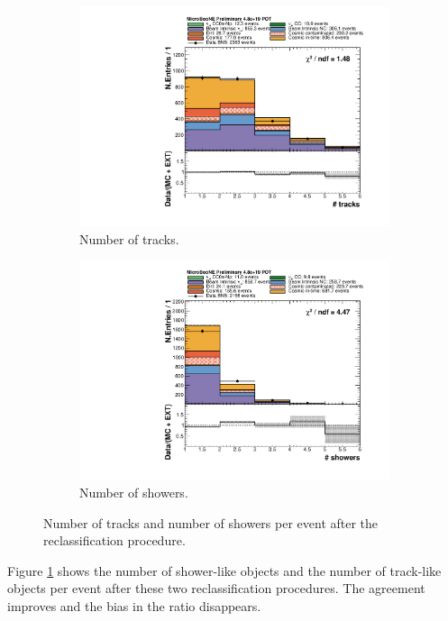 \begin{figure}[htbp]
\centering
  \begin{subfigure}{0.45\textwidth}
    \includegraphics[width=\linewidth]{figures/h_n_tracks.pdf}
    \caption{Number of tracks.} 
  \end{subfigure}
    \begin{subfigure}{0.45\textwidth}
    \includegraphics[width=\linewidth]{figures/h_n_showers.pdf}
    \caption{Number of showers.} 
  \end{subfigure}
  \caption{Number of tracks and number of showers per event after the reclassification procedure.}\label{fig:nshowers_after}
\end{figure}

Figure \ref{fig:nshowers_after} shows the number of shower-like objects and the number of track-like objects per event after these two reclassification procedures. The agreement improves and the bias in the ratio disappears. 

